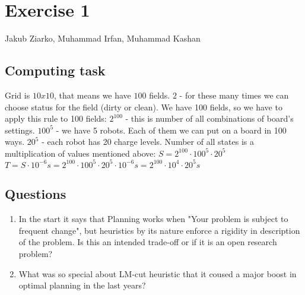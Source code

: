 





\section{Exercise 1}

Jakub Ziarko, Muhammad Irfan, Muhammad Kashan

\subsection{Computing task}

Grid is $10 x 10$, that means we have $100$ fields.
\newline
$2$ - for these many times we can choose status for the field (dirty or clean). We have 100 fields, so
we have to apply this rule to 100 fields:
\newline
$2^{100}$ - this is number of all combinations of board's settings.
\newline
$100^{5}$ - we have 5 robots. Each of them we can put on a board in 100 ways. 
\newline
$20^5$ - each robot has 20 charge levels.
\newline 
Number of all states is a multiplication of values mentioned above: 
$S=2^{100}\cdot100^{5}\cdot20^5$
\newline
$T=S \cdot 10^{-6}s= 2^{100} \cdot 100^{5} \cdot 20^5 \cdot 10^{-6}s = 2^{100} \cdot 10^4 \cdot 20^5s$ 



\subsection{Questions}

\begin{enumerate}
	\item { In the start it says that Planning works when "Your problem is subject to
	 frequent change", but heuristics by its nature enforce a rigidity in description of the problem. 
	 Is this an intended trade-off or if it is an open research problem? }
	\item { What was so special about LM-cut heuristic that it coused a major boost in optimal
	 planning in the last years?}
\end{enumerate}
 